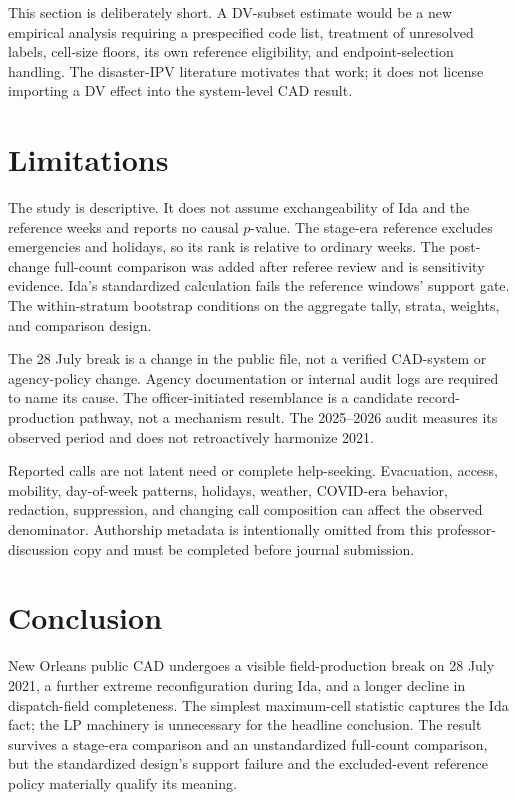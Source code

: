 \documentclass[11pt]{article}
\begin{document}
This section is deliberately short. A DV-subset estimate would be a new empirical analysis requiring a prespecified code list, treatment of unresolved labels, cell-size floors, its own reference eligibility, and endpoint-selection handling. The disaster-IPV literature motivates that work; it does not license importing a DV effect into the system-level CAD result.

\section{Limitations}

The study is descriptive. It does not assume exchangeability of Ida and the reference weeks and reports no causal $p$-value. The stage-era reference excludes emergencies and holidays, so its rank is relative to ordinary weeks. The post-change full-count comparison was added after referee review and is sensitivity evidence. Ida's standardized calculation fails the reference windows' support gate. The within-stratum bootstrap conditions on the aggregate tally, strata, weights, and comparison design.

The 28 July break is a change in the public file, not a verified CAD-system or agency-policy change. Agency documentation or internal audit logs are required to name its cause. The officer-initiated resemblance is a candidate record-production pathway, not a mechanism result. The 2025--2026 audit measures its observed period and does not retroactively harmonize 2021.

Reported calls are not latent need or complete help-seeking. Evacuation, access, mobility, day-of-week patterns, holidays, weather, COVID-era behavior, redaction, suppression, and changing call composition can affect the observed denominator. Authorship metadata is intentionally omitted from this professor-discussion copy and must be completed before journal submission.

\section{Conclusion}

New Orleans public CAD undergoes a visible field-production break on 28 July 2021, a further extreme reconfiguration during Ida, and a longer decline in dispatch-field completeness. The simplest maximum-cell statistic captures the Ida fact; the LP machinery is unnecessary for the headline conclusion. The result survives a stage-era comparison and an unstandardized full-count comparison, but the standardized design's support failure and the excluded-event reference policy materially qualify its meaning.
\end{document}
